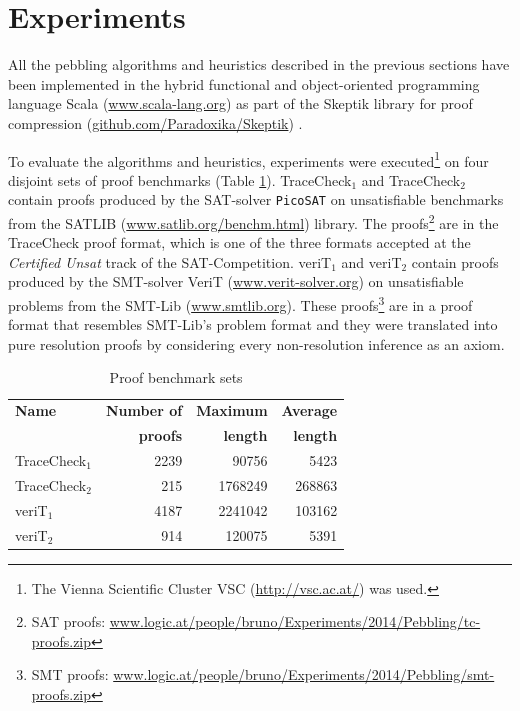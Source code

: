 \section{Experiments} 
\label{sec:experiments}

All the pebbling algorithms and heuristics described in the previous sections have been implemented in the hybrid functional and object-oriented programming
language Scala (\url{www.scala-lang.org}) as part of the Skeptik library for proof compression (\url{github.com/Paradoxika/Skeptik}) \cite{Boudou}.

To evaluate the algorithms and heuristics, experiments were executed\footnote{The Vienna Scientific Cluster VSC 
(\url{http://vsc.ac.at/}) was used.} on four disjoint sets of proof benchmarks (Table \ref{tab:benchmarks}). 
TraceCheck$_1$ and TraceCheck$_2$ contain proofs produced by the SAT-solver \texttt{PicoSAT} \cite{Biere2008} on unsatisfiable benchmarks from the SATLIB (\url{www.satlib.org/benchm.html}) library. 
The proofs\footnote{SAT proofs: \url{www.logic.at/people/bruno/Experiments/2014/Pebbling/tc-proofs.zip}} are in the TraceCheck proof format, which is one of the three formats accepted at the \emph{Certified Unsat} track of the SAT-Competition.
veriT$_1$ and veriT$_2$ contain proofs produced by the SMT-solver VeriT (\url{www.verit-solver.org}) on unsatisfiable problems from the SMT-Lib (\url{www.smtlib.org}). 
These proofs\footnote{SMT proofs: \url{www.logic.at/people/bruno/Experiments/2014/Pebbling/smt-proofs.zip}} are in a proof format that resembles SMT-Lib's problem format and they were translated into pure resolution proofs by considering every non-resolution inference as an axiom.


\begin{table}[tb]
	\centering
	\setlength{\tabcolsep}{8pt}
	\begin{tabular}{lrrr}
		\toprule
		\textbf{Name} & \textbf{Number of} & \textbf{Maximum} & \textbf{Average} \\ 
		              & \textbf{proofs}    & \textbf{length}  & \textbf{length} \\
		\midrule
		TraceCheck$_1$ & 2239 & 90756   & 5423   \\
		TraceCheck$_2$ & 215	& 1768249 & 268863 \\
    veriT$_1$ & 4187 & 2241042 & 103162 \\
    veriT$_2$ & 914  & 120075  & 5391  \\ 
		\bottomrule   
	\end{tabular}
	\caption{Proof benchmark sets}
	\label{tab:benchmarks}
\end{table}

